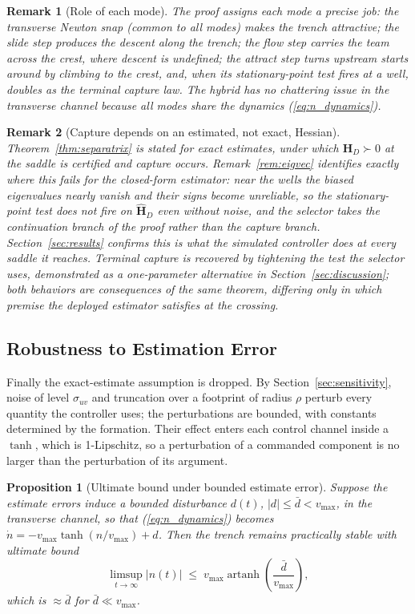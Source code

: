 \documentclass[lettersize,journal]{IEEEtran}
\newtheorem{proposition}{Proposition}
\newtheorem{remark}{Remark}
\begin{document}
\begin{remark}[Role of each mode]
The proof assigns each mode a precise job: the transverse Newton snap
(common to all modes) makes the trench attractive; the slide step produces the
descent along the trench; the flow step carries the team across the crest, where
descent is undefined; the attract step turns upstream starts around by climbing to
the crest, and, when its stationary-point test fires at a well, doubles as the
terminal capture law. The
hybrid has no chattering issue in the transverse channel because all
modes share the dynamics (\ref{eq:n_dynamics}).
\end{remark}

\begin{remark}[Capture depends on an estimated, not exact, Hessian]
\label{rem:capture_gap}
Theorem~\ref{thm:separatrix} is stated for exact estimates, under which
$\mathbf{H}_D \succ 0$ at the saddle is certified and capture occurs.
Remark~\ref{rem:eigvec} identifies exactly where this fails for the
closed-form estimator: near the wells the biased eigenvalues nearly
vanish and their signs become unreliable, so the stationary-point test
does not fire on $\hat{\mathbf{H}}_D$ even without noise, and the
selector takes the continuation branch of the proof rather than the
capture branch. Section~\ref{sec:results} confirms this is what the
simulated controller does at every saddle it reaches. Terminal capture
is recovered by tightening the test the selector uses, demonstrated as
a one-parameter alternative in Section~\ref{sec:discussion}; both
behaviors are consequences of the same theorem, differing only in which
premise the deployed estimator satisfies at the crossing.
\end{remark}

\subsection{Robustness to Estimation Error}
\label{sec:stab_iss}

Finally the exact-estimate assumption is dropped. By
Section~\ref{sec:sensitivity}, noise of level $\sigma_{uv}$ and
truncation over a footprint of radius $\rho$ perturb every quantity the
controller uses; the perturbations are bounded, with constants
determined by the formation. Their effect enters each control channel
inside a $\tanh$, which is 1-Lipschitz, so a perturbation of a
commanded component is no larger than the perturbation of its argument.

\begin{proposition}[Ultimate bound under bounded estimate error]
\label{prop:iss}
Suppose the estimate errors induce a bounded disturbance $d(t)$, $|d|
\leq \bar{d} < v_{\max}$, in the transverse channel, so that
(\ref{eq:n_dynamics}) becomes $\dot{n} = -v_{\max}\tanh(n/v_{\max}) +
d$. Then the trench remains practically stable with ultimate bound
\begin{equation}
    \limsup_{t\to\infty} |n(t)| \;\leq\;
    v_{\max}\operatorname{artanh}\!\left(\frac{\bar{d}}{v_{\max}}\right),
    \label{eq:iss_bound}
\end{equation}
which is $\approx \bar{d}$ for $\bar{d} \ll v_{\max}$.
\end{proposition}
\end{document}
